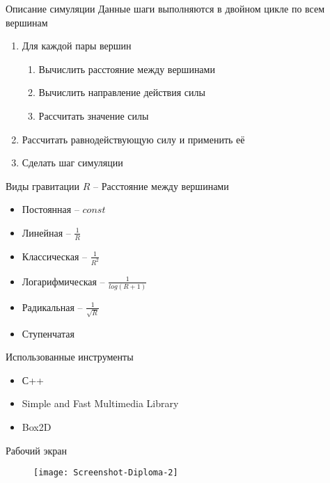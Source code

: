\documentclass{beamer}
\theoremstyle{plain}
\begin{document}
\begin{frame}{Описание симуляции}
  Данные шаги выполняются в двойном цикле по всем вершинам
  \begin{enumerate}
    \item Для каждой пары вершин
    \begin{enumerate}
      \item Вычислить расстояние между вершинами
      \item Вычислить направление действия силы
      \item Рассчитать значение силы
    \end{enumerate}
    \item Рассчитать равнодействующую силу и применить её
    \item Сделать шаг симуляции
  \end{enumerate}

\end{frame}


\begin{frame}{Виды гравитации}
  $R$ -- Расстояние между вершинами
  \begin{itemize}
    \item Постоянная -- $const$
    \item Линейная -- $\frac{1}{R}$
    \item Классическая -- $\frac{1}{R^2}$
    \item Логарифмическая -- $\frac{1}{log(R + 1)}$
    \item Радикальная -- $\frac{1}{\sqrt R}$
    \item Ступенчатая
  \end{itemize}
\end{frame}

\begin{frame}{Использованные инструменты}
  \begin{itemize}
    \item С++
    \item Simple and Fast Multimedia Library
    \item Box2D
  \end{itemize}
\end{frame}

\begin{frame}{Рабочий экран}
  \begin{figure}[h]
    \centering
    \texttt{[image: Screenshot-Diploma-2]}
  \end{figure}
\end{frame}
\end{document}

